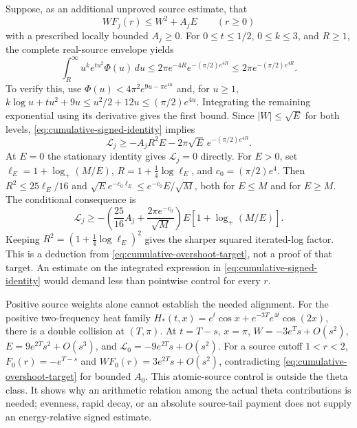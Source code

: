 \documentclass[11pt]{article}
\numberwithin{equation}{section}
\theoremstyle{definition}
\theoremstyle{remark}
\newcommand{\Lag}{\mathcal L}
\begin{document}
Suppose, as an additional unproved source estimate, that
\begin{equation}
 WF_j(r)\le W^2+A_jE\qquad(r\ge0)
 \label{eq:cumulative-overshoot-target}
\end{equation}
with a prescribed locally bounded $A_j\ge0$.  For $0\le t\le1/2$,
$0\le k\le3$, and $R\ge1$, the complete real-source envelope yields
\begin{equation}
 \int_R^\infty u^ke^{tu^2}\Phi(u)\,du
 \le2\pi e^{-4R}e^{-(\pi/2)e^{4R}}
 \le2\pi e^{-(\pi/2)e^{4R}}.
 \label{eq:cumulative-real-tail}
\end{equation}
To verify this, use $\Phi(u)<4\pi^2e^{9u-\pi e^{4u}}$ and, for
$u\ge1$, $k\log u+tu^2+9u\le u^2/2+12u\le(\pi/2)e^{4u}$.
Integrating the remaining exponential using its derivative gives the
first bound.  Since $|W|\le\sqrt E$ for both levels,
\eqref{eq:cumulative-signed-identity} implies
\[
 \Lag_j\ge-A_jR^2E-2\pi\sqrt E\,e^{-(\pi/2)e^{4R}}.
\]
At $E=0$ the stationary identity gives $\Lag_j=0$ directly. For $E>0$, set $\ell_E=1+\log_+(M/E)$,
$R=1+\tfrac14\log\ell_E$, and $c_0=(\pi/2)e^4$.
Then $R^2\le25\ell_E/16$ and
$\sqrt E e^{-c_0\ell_E}\le e^{-c_0}E/\sqrt M$, both for
$E\le M$ and for $E\ge M$.  The conditional consequence is
\[
 \Lag_j\ge-\left(\frac{25}{16}A_j+
                 \frac{2\pi e^{-c_0}}{\sqrt M}\right)
                  E[1+\log_+(M/E)].
\]
Keeping $R^2=(1+\frac14\log\ell_E)^2$ gives the sharper squared
iterated-log factor.  This is a deduction from
\eqref{eq:cumulative-overshoot-target}, not a proof of that target.
An estimate on the integrated expression in
\eqref{eq:cumulative-signed-identity} would demand less than pointwise
control for every $r$.

Positive source weights alone cannot establish the needed alignment.
For the positive two-frequency heat family
$H_*(t,x)=e^t\cos x+e^{-3T}e^{4t}\cos(2x)$, there is a double
collision at $(T,\pi)$.  At $t=T-s$, $x=\pi$,
$W=-3e^Ts+O(s^2)$, $E=9e^{2T}s^2+O(s^3)$, and
$\Lag_0=-9e^{2T}s+O(s^2)$.  For a source cutoff $1<r<2$,
$F_0(r)=-e^{T-s}$ and $WF_0(r)=3e^{2T}s+O(s^2)$, contradicting
\eqref{eq:cumulative-overshoot-target} for bounded $A_0$.
This atomic-source control is outside the theta class.  It shows why
an arithmetic relation among the actual theta contributions is needed;
evenness, rapid decay, or an absolute source-tail payment does not supply
an energy-relative signed estimate.

\end{document}
